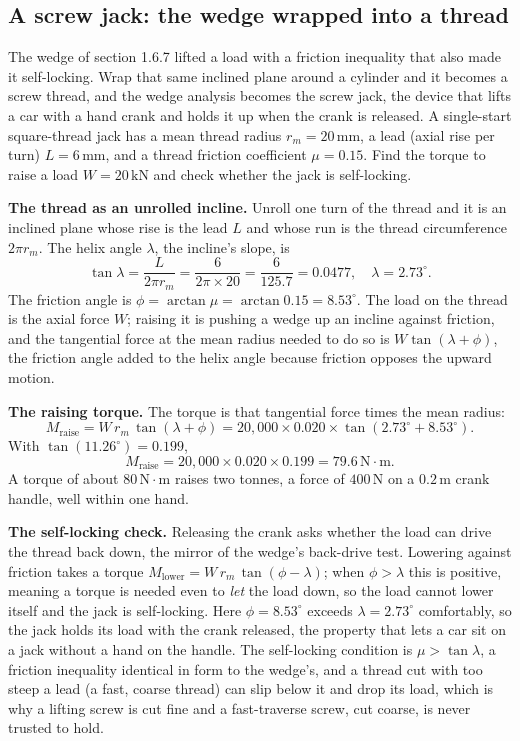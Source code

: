 \subsection{A screw jack: the wedge wrapped into a thread}

The wedge of section 1.6.7 lifted a load with a friction inequality that also
made it self-locking. Wrap that same inclined plane around a cylinder and it
becomes a screw thread, and the wedge analysis becomes the screw jack, the
device that lifts a car with a hand crank and holds it up when the crank is
released. A single-start square-thread jack has a mean thread radius $r_m =
20\,\si{\milli\meter}$, a lead (axial rise per turn) $L = 6\,\si{\milli\meter}$,
and a thread friction coefficient $\mu = 0.15$. Find the torque to raise a load
$W = 20\,\text{kN}$ and check whether the jack is self-locking.

\textbf{The thread as an unrolled incline.} Unroll one turn of the thread and
it is an inclined plane whose rise is the lead $L$ and whose run is the thread
circumference $2\pi r_m$. The helix angle $\lambda$, the incline's slope, is
\[
\tan\lambda = \frac{L}{2\pi r_m} = \frac{6}{2\pi \times 20} = \frac{6}{125.7}
= 0.0477, \quad \lambda = 2.73^{\circ}.
\]
The friction angle is $\phi = \arctan\mu = \arctan 0.15 = 8.53^{\circ}$. The
load on the thread is the axial force $W$; raising it is pushing a wedge up an
incline against friction, and the tangential force at the mean radius needed to
do so is $W\tan(\lambda + \phi)$, the friction angle added to the helix angle
because friction opposes the upward motion.

\textbf{The raising torque.} The torque is that tangential force times the mean
radius:
\[
M_{\text{raise}} = W\,r_m\,\tan(\lambda + \phi)
= 20{,}000 \times 0.020 \times \tan(2.73^{\circ} + 8.53^{\circ}).
\]
With $\tan(11.26^{\circ}) = 0.199$,
\[
M_{\text{raise}} = 20{,}000 \times 0.020 \times 0.199 = 79.6\,\text{N}\cdot\text{m}.
\]
A torque of about $80\,\text{N}\cdot\text{m}$ raises two tonnes, a force of
$400\,\text{N}$ on a $0.2\,\si{\meter}$ crank handle, well within one hand.

\textbf{The self-locking check.} Releasing the crank asks whether the load can
drive the thread back down, the mirror of the wedge's back-drive test. Lowering
against friction takes a torque $M_{\text{lower}} = W\,r_m\,\tan(\phi -
\lambda)$; when $\phi > \lambda$ this is positive, meaning a torque is needed
even to \emph{let} the load down, so the load cannot lower itself and the jack
is self-locking. Here $\phi = 8.53^{\circ}$ exceeds $\lambda = 2.73^{\circ}$
comfortably, so the jack holds its load with the crank released, the property
that lets a car sit on a jack without a hand on the handle. The self-locking
condition is $\mu > \tan\lambda$, a friction inequality identical in form to
the wedge's, and a thread cut with too steep a lead (a fast, coarse thread)
can slip below it and drop its load, which is why a lifting screw is cut fine
and a fast-traverse screw, cut coarse, is never trusted to hold.

